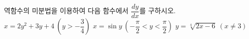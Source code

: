 역함수의 미분법을 이용하여 다음 함수에서 $\dfrac{dy}{dx}$를 구하시오.
 $x=2y^2+3y+4\ \left(y>-\dfrac{3}{4}\right)$
 $x=\sin y\ \left(-\dfrac{\pi}{2}<y<\dfrac{\pi}{2}\right)$
 $y=\sqrt[4]{2x-6}\ (x\ne 3)$
